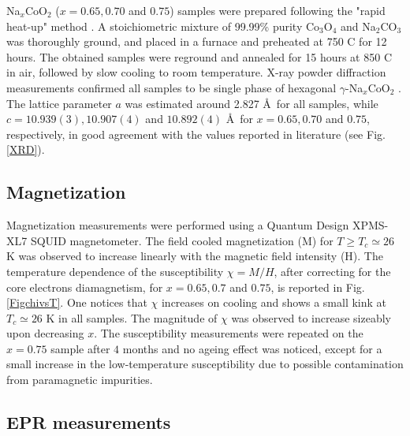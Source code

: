 \documentclass[prb,showpacs,preprintnumbers,amsmath,amssymb,floatfix]{revtex4}
\begin{document}
Na$_x$CoO$_2$ ($x=0.65, 0.70$ and $0.75$) samples were prepared
following the "rapid heat-up" method \cite{Bra1,Bra2}. A
stoichiometric mixture of 99.99\% purity Co$_3$O$_4$ and
Na$_2$CO$_3$ was thoroughly ground, and placed in a furnace and
preheated at 750 C for 12 hours. The obtained samples were
reground and annealed for 15 hours at 850 C in air, followed by
slow cooling to room temperature. X-ray powder diffraction
measurements confirmed all samples to be single phase of hexagonal
$\gamma$-Na$_x$CoO$_2$ \cite{Bra3,Bra4}. The lattice parameter $a$
was estimated around 2.827 \AA \, for all samples, while $c=
10.939(3), 10.907(4)$ and $10.892(4)$ \AA \, for $x=0.65, 0.70$
and $0.75$, respectively, in good agreement with the values
reported in literature (see Fig.\ref{XRD}).



\subsection{Magnetization}

Magnetization  measurements were performed using a Quantum Design
XPMS-XL7 SQUID magnetometer. The field cooled magnetization (M)
for $T\geq T_c\simeq 26$ K was observed to increase linearly with
the magnetic field intensity (H). The temperature dependence of
the susceptibility $\chi =M/H$, after correcting for the core
electrons diamagnetism, for $x=0.65, 0.7$ and $0.75$, is reported
in Fig.\ref{FigchivsT}. One notices that $\chi$ increases on
cooling and shows a small kink at $T_c\simeq 26$ K in all samples.
The magnitude of $\chi$ was observed to increase sizeably upon
decreasing $x$. The susceptibility measurements were repeated on
the $x=0.75$ sample after $4$ months and no ageing effect was
noticed, except for a small increase in the low-temperature
susceptibility due to possible contamination from paramagnetic
impurities.


\subsection{EPR measurements}
\end{document}
